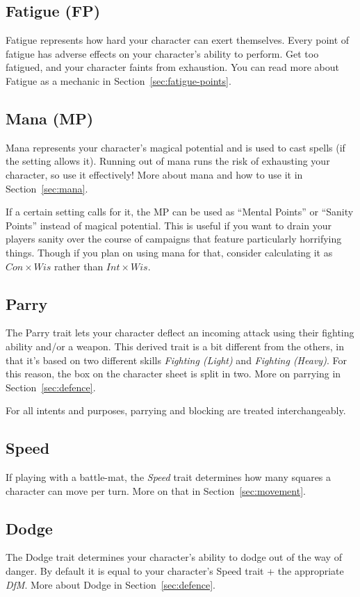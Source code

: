 \subsection{Fatigue (FP)}
Fatigue represents how hard your character can exert themselves.
Every point of fatigue has adverse effects on your character's ability to perform.
Get too fatigued, and your character faints from exhaustion.
You can read more about Fatigue as a mechanic in Section~\ref{sec:fatigue-points}.

\subsection{Mana (MP)}
Mana represents your character's magical potential and is used to cast spells (if the setting allows it).
Running out of mana runs the risk of exhausting your character, so use it effectively!
More about mana and how to use it in Section~\ref{sec:mana}.

\note If a certain setting calls for it, the MP can be used as ``Mental Points'' or ``Sanity Points'' instead of magical potential.
This is useful if you want to drain your players sanity over the course of campaigns that feature particularly horrifying things.
Though if you plan on using mana for that, consider calculating it as $Con \times Wis$ rather than $Int \times Wis$.

\subsection{Parry}
The Parry trait lets your character deflect an incoming attack using their fighting ability and/or a weapon.
This derived trait is a bit different from the others, in that it's based on two different skills \textit{Fighting (Light)} and \textit{Fighting (Heavy)}.
For this reason, the box on the character sheet is split in two.
More on parrying in Section~\ref{sec:defence}.

\note For all intents and purposes, parrying and blocking are treated interchangeably.

\subsection{Speed}
If playing with a battle-mat, the \textit{Speed} trait determines how many squares a character can move per turn.
More on that in Section~\ref{sec:movement}.

\subsection{Dodge}
The Dodge trait determines your character's ability to dodge out of the way of danger. 
By default it is equal to your character's Speed trait + the appropriate \textit{DfM}.
More about Dodge in Section~\ref{sec:defence}.

